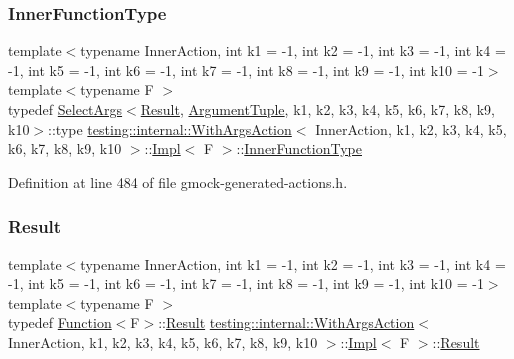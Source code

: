 \subsubsection{\texorpdfstring{Inner\+Function\+Type}{InnerFunctionType}}
{\footnotesize\ttfamily template$<$typename Inner\+Action, int k1 = -\/1, int k2 = -\/1, int k3 = -\/1, int k4 = -\/1, int k5 = -\/1, int k6 = -\/1, int k7 = -\/1, int k8 = -\/1, int k9 = -\/1, int k10 = -\/1$>$ \\
template$<$typename F $>$ \\
typedef \hyperlink{classtesting_1_1internal_1_1SelectArgs}{Select\+Args}$<$\hyperlink{classtesting_1_1ActionInterface_a7477de2fe3e4e01c59db698203acaee7}{Result}, \hyperlink{classtesting_1_1ActionInterface_af72720d864da4d606629e83edc003511}{Argument\+Tuple}, k1, k2, k3, k4, k5, k6, k7, k8, k9, k10$>$\+::type \hyperlink{classtesting_1_1internal_1_1WithArgsAction}{testing\+::internal\+::\+With\+Args\+Action}$<$ Inner\+Action, k1, k2, k3, k4, k5, k6, k7, k8, k9, k10 $>$\+::\hyperlink{classtesting_1_1internal_1_1WithArgsAction_1_1Impl}{Impl}$<$ F $>$\+::\hyperlink{classtesting_1_1internal_1_1WithArgsAction_1_1Impl_a19859cc3f545dc2a988638d4c2ca1fee}{Inner\+Function\+Type}\hspace{0.3cm}{\ttfamily [private]}}



Definition at line 484 of file gmock-\/generated-\/actions.\+h.

\mbox{\label{classtesting_1_1internal_1_1WithArgsAction_1_1Impl_a967047b99af8f852f4fa2883be283e1a}} 
\subsubsection{\texorpdfstring{Result}{Result}}
{\footnotesize\ttfamily template$<$typename Inner\+Action, int k1 = -\/1, int k2 = -\/1, int k3 = -\/1, int k4 = -\/1, int k5 = -\/1, int k6 = -\/1, int k7 = -\/1, int k8 = -\/1, int k9 = -\/1, int k10 = -\/1$>$ \\
template$<$typename F $>$ \\
typedef \hyperlink{structtesting_1_1internal_1_1Function}{Function}$<$F$>$\+::\hyperlink{classtesting_1_1ActionInterface_a7477de2fe3e4e01c59db698203acaee7}{Result} \hyperlink{classtesting_1_1internal_1_1WithArgsAction}{testing\+::internal\+::\+With\+Args\+Action}$<$ Inner\+Action, k1, k2, k3, k4, k5, k6, k7, k8, k9, k10 $>$\+::\hyperlink{classtesting_1_1internal_1_1WithArgsAction_1_1Impl}{Impl}$<$ F $>$\+::\hyperlink{classtesting_1_1ActionInterface_a7477de2fe3e4e01c59db698203acaee7}{Result}}



